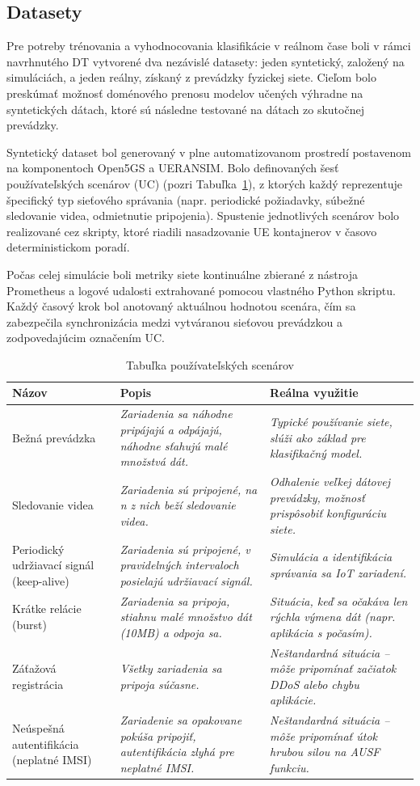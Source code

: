 \documentclass[a4paper,10pt]{ieeetran}
\begin{document}
\subsection{Datasety}
\label{subsec1}
Pre potreby trénovania a vyhodnocovania klasifikácie v reálnom čase boli v rámci navrhnutého DT vytvorené dva nezávislé datasety: jeden syntetický, založený na simuláciách, a jeden reálny, získaný z prevádzky fyzickej siete. Cieľom bolo preskúmať možnosť doménového prenosu modelov učených výhradne na syntetických dátach, ktoré sú následne testované na dátach zo skutočnej prevádzky.

Syntetický dataset bol generovaný v plne automatizovanom prostredí postavenom na komponentoch Open5GS a UERANSIM. Bolo definovaných šesť používateľských scenárov (UC) (pozri Tabuľka~\ref{table:uc}), z ktorých každý reprezentuje špecifický typ sieťového správania (napr. periodické požiadavky, súbežné sledovanie videa, odmietnutie pripojenia). Spustenie jednotlivých scenárov bolo realizované cez skripty, ktoré riadili nasadzovanie UE kontajnerov v časovo deterministickom poradí. 

Počas celej simulácie boli metriky siete kontinuálne zbierané z nástroja Prometheus a logové udalosti extrahované pomocou vlastného Python skriptu. Každý časový krok bol anotovaný aktuálnou hodnotou scenára, čím sa zabezpečila synchronizácia medzi vytváranou sieťovou prevádzkou a zodpovedajúcim označením UC.

\begin{table}
\renewcommand{\arraystretch}{1.5}  %
\caption{Tabuľka používateľských scenárov}
\label{table:uc}
\begin{tabularx}{\textwidth}{X|X|X}
Názov & Popis & Reálna využitie \\ \hline 
Bežná prevádzka & \textit{Zariadenia sa náhodne pripájajú a odpájajú, náhodne sťahujú malé množstvá dát.} & \textit{Typické používanie siete, slúži ako základ pre klasifikačný model.} \\ \hline
Sledovanie videa & \textit{Zariadenia sú pripojené, na n z nich beží sledovanie videa.} & \textit{Odhalenie veľkej dátovej prevádzky, možnosť prispôsobiť konfiguráciu siete.} \\ \hline
Periodický udržiavací signál (keep-alive) & \textit{Zariadenia sú pripojené, v pravidelných intervaloch posielajú udržiavací signál.} & \textit{Simulácia a identifikácia správania sa IoT zariadení.} \\ \hline
Krátke relácie (burst) & \textit{Zariadenia sa pripoja, stiahnu malé množstvo dát (10MB) a odpoja sa.} & \textit{Situácia, keď sa očakáva len rýchla výmena dát (napr. aplikácia s počasím).} \\ \hline
Záťažová registrácia & \textit{Všetky zariadenia sa pripoja súčasne.} & \textit{Neštandardná situácia – môže pripomínať začiatok DDoS alebo chybu aplikácie.} \\ \hline
Neúspešná autentifikácia (neplatné IMSI) & \textit{Zariadenie sa opakovane pokúša pripojiť, autentifikácia zlyhá pre neplatné IMSI.} & \textit{Neštandardná situácia – môže pripomínať útok hrubou silou na AUSF funkciu.}   
\end{tabularx}
\end{table}
\end{document}
